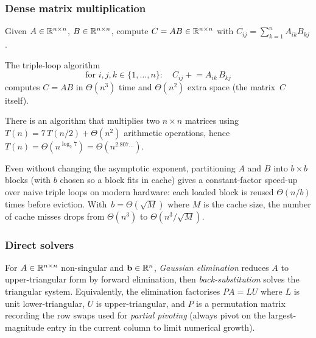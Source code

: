 \subsubsection*{Dense matrix multiplication}

Given $A \in \mathbb{R}^{n \times n}$, $B \in \mathbb{R}^{n \times n}$, compute
$C = AB \in \mathbb{R}^{n \times n}$ with $C_{ij} = \sum_{k=1}^{n} A_{ik} B_{kj}$.

\begin{proposition}
\label{prop:naive-matmul}
The triple-loop algorithm
\[
  \text{for } i, j, k \in \{1, \dots, n\}\colon\quad C_{ij} \mathrel{+}= A_{ik}\, B_{kj}
\]
computes $C = AB$ in $\Theta(n^3)$ time and $\Theta(n^2)$ extra space
(the matrix~$C$ itself).
\end{proposition}

\begin{theorem}[Strassen 1969]
\label{thm:strassen}
There is an algorithm that multiplies two $n \times n$ matrices using
$T(n) = 7\, T(n/2) + \Theta(n^2)$ arithmetic operations, hence
$T(n) = \Theta(n^{\log_2 7}) = \Theta(n^{2.807\ldots})$.
\end{theorem}

\begin{remark}
Even without changing the asymptotic exponent, partitioning $A$ and
$B$ into $b \times b$ blocks (with $b$ chosen so a block fits in
cache) gives a constant-factor speed-up over naive triple loops on
modern hardware: each loaded block is reused $\Theta(n/b)$ times
before eviction. With~$b = \Theta(\sqrt{M})$ where $M$ is the cache
size, the number of cache misses drops from $\Theta(n^3)$ to
$\Theta(n^3 / \sqrt{M})$.
\end{remark}

\subsubsection*{Direct solvers}

For $A \in \mathbb{R}^{n \times n}$ non-singular and $\mathbf{b} \in \mathbb{R}^n$,
\emph{Gaussian elimination} reduces $A$ to upper-triangular form by
forward elimination, then \emph{back-substitution} solves the
triangular system. Equivalently, the elimination factorises
$P A = L U$ where $L$ is unit lower-triangular, $U$ is upper-triangular,
and $P$ is a permutation matrix recording the row swaps used for
\emph{partial pivoting} (always pivot on the largest-magnitude entry
in the current column to limit numerical growth).

